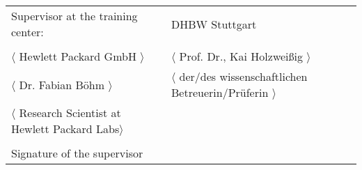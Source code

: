 \begin{spacing}{1}
\vfill

\begin{tabular}{ll}
Supervisor at the training center: & DHBW Stuttgart \\
\hspace{0.4\linewidth} & \\
$\langle$ Hewlett Packard GmbH $\rangle$ & $\langle$ Prof. Dr., Kai Holzweißig $\rangle$ \\
$\langle$ Dr. Fabian Böhm $\rangle$ 
& $\langle$ der/des wissenschaftlichen Betreuerin/Prüferin $\rangle$ \\
$\langle$ Research Scientist at Hewlett Packard Labs$\rangle$ \\
\\
Signature of the supervisor \\
\end{tabular}


\vspace{1cm}
\end{spacing}

 

